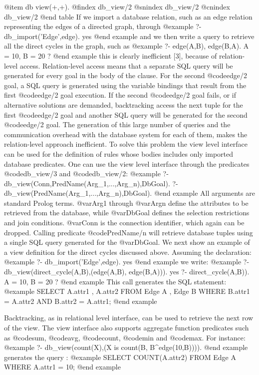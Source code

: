 {{{{{{{{{@item db view(+,+).
@findex db_view/2
@snindex db_view/2
@cnindex db_view/2
@end table
If we import a database relation, such as an edge relation representing the edges of a directed graph, through
@example
?- db_import('Edge',edge). 
yes
@end example
and we then write a query to retrieve all the direct cycles in the
graph, such as
@example
?- edge(A,B), edge(B,A). 
A = 10, 
B = 20 ?
@end example
this is clearly inefficient [3], because of relation-level
access. Relation-level access means that a separate SQL query will be
generated for every goal in the body of the clause. For the second
@code{edge/2} goal, a SQL query is generated using the variable bindings that
result from the first @code{edge/2} goal execution. If the second
@code{edge/2} goal
fails, or if alternative solutions are demanded, backtracking access the
next tuple for the first @code{edge/2} goal and another SQL query will be
generated for the second @code{edge/2} goal. The generation of this large
number of queries and the communication overhead with the database
system for each of them, makes the relation-level approach inefficient.
To solve this problem the view level interface can be used for the
definition of rules whose bodies includes only imported database
predicates.  One can use the view level interface through the predicates
@code{db_view/3} and @code{db_view/2}:
@example
?- db_view(Conn,PredName(Arg_1,...,Arg_n),DbGoal).  
?- db_view(PredName(Arg_1,...,Arg_n),DbGoal).
@end example
 All arguments are standard Prolog terms. @var{Arg1} through @var{Argn}
define the attributes to be retrieved from the database, while
@var{DbGoal} defines the selection restrictions and join
conditions. @var{Conn} is the connection identifier, which again can be
dropped. Calling predicate @code{PredName/n} will retrieve database
tuples using a single SQL query generated for the @var{DbGoal}.  We next show
an example of a view definition for the direct cycles discussed
above. Assuming the declaration: 
@example
?- db_import('Edge',edge). 
yes
@end example
we
write:
@example
?- db_view(direct_cycle(A,B),(edge(A,B), edge(B,A))). 
yes 
?- direct_cycle(A,B)). 
A = 10, 
B = 20 ?  
@end example
This call generates the SQL
statement: 
@example
SELECT A.attr1 , A.attr2
FROM Edge A , Edge B 
WHERE B.attr1 = A.attr2 AND B.attr2 = A.attr1;
@end example

Backtracking, as in relational level interface, can be used to retrieve the next row of the view.
The view interface also supports aggregate function predicates such as
@code{sum}, @code{avg}, @code{count}, @code{min} and @code{max}. For
instance:
@example
?- db_view(count(X),(X is count(B, B^edge(10,B)))).
@end example
generates the query :
@example
SELECT COUNT(A.attr2) 
FROM Edge A WHERE A.attr1 = 10;
@end example

}}}}}}}}}
